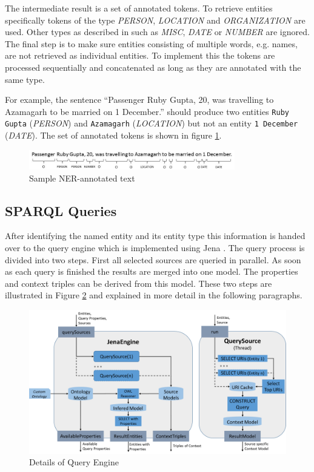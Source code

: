 The intermediate result is a set of annotated tokens. To retrieve entities specifically tokens of the type \textit{PERSON}, \textit{LOCATION} and \textit{ORGANIZATION} are used. Other types as described in \cite{CoreNLP_NER} such as \textit{MISC}, \textit{DATE} or \textit{NUMBER} are ignored. The final step is to make sure entities consisting of multiple words, e.g. names, are not retrieved as individual entities. To implement this the tokens are processed sequentially and concatenated as long as they are annotated with the same type. 

For example, the sentence ``Passenger Ruby Gupta, 20, was travelling to Azamagarh to be married on 1 December.'' should produce two entities \texttt{Ruby Gupta} (\textit{PERSON}) and \texttt{Azamagarh} (\textit{LOCATION}) but not an entity \texttt{1 December} (\textit{DATE}). The set of annotated tokens is shown in figure \ref{fig:nerExample}. 

 \begin{figure}[ht]
	\centering
	\includegraphics[width=0.8\textwidth]{img/nerExample}
	\caption{Sample NER-annotated text}
	\label{fig:nerExample}
\end{figure}
 




\subsection{SPARQL Queries}
\label{sec:sparqlQueries}
After identifying the named entity and its entity type this information is handed over to the query engine which is implemented using Jena \cite{apache_apache_2016}. The query process is divided into two steps. First all selected sources are queried in parallel. As soon as each query is finished the results are merged into one model. The properties and context triples can be derived from this model. These two steps are illustrated in Figure \ref{fig:details_query} and explained in more detail in the following paragraphs.
\begin{figure}[ht]
	\centering
	\includegraphics[width=1\textwidth]{img/QueryEngineDetails}
	\caption{Details of Query Engine}
	\label{fig:details_query}
\end{figure}

